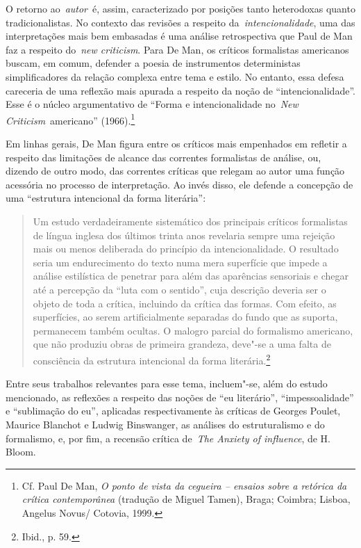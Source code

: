 O retorno ao~\emph{autor}~é, assim, caracterizado por posições tanto
heterodoxas quanto tradicionalistas. No contexto das revisões a respeito
da\emph{~intencionalidade}, uma das interpretações mais bem embasadas é
uma análise retrospectiva que Paul de Man faz a respeito do~\emph{new
criticism}. Para De Man, os críticos formalistas americanos buscam, em
comum, defender a poesia de instrumentos deterministas simplificadores
da relação complexa entre tema e estilo. No entanto, essa defesa
careceria de uma reflexão mais apurada a respeito da noção de
``intencionalidade''. Esse é o núcleo argumentativo de ``Forma e
intencionalidade no~\emph{New Criticism}~americano'' (1966).\footnote{Cf.
  Paul De Man, \emph{O ponto de vista da cegueira -- ensaios sobre a
  retórica da crítica contemporânea} (tradução de Miguel Tamen), Braga;
  Coimbra; Lisboa, Angelus Novus/ Cotovia, 1999.}

Em linhas gerais, De Man figura entre os críticos mais empenhados em
refletir a respeito das limitações de alcance das correntes formalistas
de análise, ou, dizendo de outro modo, das correntes críticas que
relegam ao autor uma função acessória no processo de interpretação. Ao
invés disso, ele defende a concepção de uma ``estrutura intencional da
forma literária'':

\begin{quote}
Um estudo verdadeiramente sistemático dos principais críticos
formalistas de língua inglesa dos últimos trinta anos revelaria sempre
uma rejeição mais ou menos deliberada do princípio da intencionalidade.
O resultado seria um endurecimento do texto numa mera superfície que
impede a análise estilística de penetrar para além das aparências
sensoriais e chegar até a percepção da ``luta com o sentido'', cuja
descrição deveria ser o objeto de toda a crítica, incluindo da crítica
das formas. Com efeito, as superfícies, ao serem artificialmente
separadas do fundo que as suporta, permanecem também ocultas. O malogro
parcial do formalismo americano, que não produziu obras de primeira
grandeza, deve"-se a uma falta de consciência da estrutura intencional da
forma literária.\footnote{Ibid., p. 59.}
\end{quote}

Entre seus trabalhos relevantes para esse tema, incluem"-se, além do
estudo mencionado, as reflexões a respeito das noções de ``eu
literário'', ``impessoalidade'' e ``sublimação do eu'', aplicadas
respectivamente às críticas de Georges Poulet, Maurice Blanchot e Ludwig
Binswanger, as análises do estruturalismo e do formalismo, e, por fim, a
recensão crítica de~\emph{The Anxiety of influence}, de H. Bloom.

